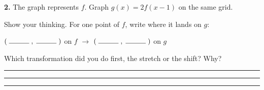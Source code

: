 \documentclass[11pt]{article}
\begin{document}
\vspace{6pt}
\begin{minipage}[t]{0.56\textwidth}
\textbf{2.} The graph represents $f$. Graph $g(x)=2f(x-1)$ on the same grid.

\vspace{6pt}
Show your thinking. For one point of $f$, write where it lands on $g$:

\vspace{6pt}
$(\;\rule{1cm}{0.4pt}\;,\;\rule{1cm}{0.4pt}\;)$ on $f$ \;$\longrightarrow$\; $(\;\rule{1cm}{0.4pt}\;,\;\rule{1cm}{0.4pt}\;)$ on $g$

\vspace{8pt}
Which transformation did you do first, the stretch or the shift? Why?

\vspace{4pt}\rule{\linewidth}{0.4pt}

\vspace{10pt}\rule{\linewidth}{0.4pt}
\end{minipage}\hfill
\begin{minipage}[t]{0.42\textwidth}
\vspace{-6pt}
\end{minipage}

\vspace{10pt}\noindent\rule{\textwidth}{0.4pt}
\end{document}
